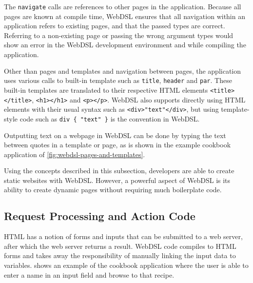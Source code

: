       The \texttt{navigate} calls are references to other pages in the application. Because all pages are known at compile time, WebDSL ensures that all navigation within an application refers to existing pages, and that the passed types are correct. Referring to a non-existing page or passing the wrong argument types would show an error in the WebDSL development environment and while compiling the application.
      
      Other than pages and templates and navigation between pages, the application uses various calls to built-in template such as \texttt{title}, \texttt{header} and \texttt{par}. These built-in templates are translated to their respective HTML elements \texttt{<title></title>}, \texttt{<h1></h1>} and \texttt{<p></p>}. WebDSL also supports directly using HTML elements with their usual syntax such as \texttt{<div>"text"</div>}, but using template-style code such as \texttt{div \{ "text" \}} is the convention in WebDSL.

      Outputting text on a webpage in WebDSL can be done by typing the text between quotes in a template or page, as is shown in the example cookbook application of \cref{fig:webdsl-pages-and-templates}.

      Using the concepts described in this subsection, developers are able to create static websites with WebDSL. However, a powerful aspect of WebDSL is its ability to create dynamic pages without requiring much boilerplate code.

    \subsection{\label{subsec:request-processing}Request Processing and Action Code}

      HTML has a notion of forms and inputs that can be submitted to a web server, after which the web server returns a result. WebDSL code compiles to HTML forms and takes away the responsibility of manually linking the input data to variables.  shows an example of the cookbook application where the user is able to enter a name in an input field and browse to that recipe.

